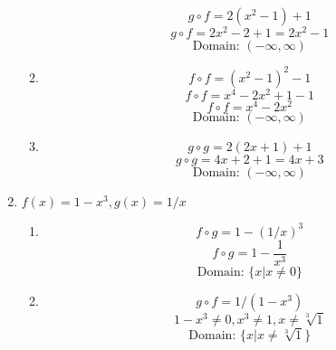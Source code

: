 \documentclass{article}
\begin{document}
\begin{enumerate}
\begin{enumerate}
			$$g \circ f = 2(x^2 - 1) + 1$$
			$$g \circ f = 2x^2 - 2 + 1 = 2x^2 - 1$$
			$$\text{Domain: } (-\infty, \infty)$$
			
			\item
			
			$$f \circ f = (x^2 - 1)^2 - 1$$
			$$f \circ f = x^4 - 2x^2 + 1 - 1$$
			$$f \circ f = x^4 - 2x^2$$
			$$\text{Domain: } (-\infty, \infty)$$
			
			\item
			
			$$g \circ g = 2(2x + 1) + 1$$
			$$g \circ g = 4x + 2 + 1 = 4x + 3$$
			$$\text{Domain: } (-\infty, \infty)$$
		\end{enumerate}
		
		\item $f(x) = 1 - x^3, g(x) = 1/x$
		
		\begin{enumerate}
		
			\item
			$$f \circ g = 1 - (1/x)^3$$
			$$f \circ g = 1 - \frac{1}{x^3}$$
			$$\text{Domain: } \{x | x \neq 0\}$$
			
			\item
			$$g \circ f = 1 / (1 - x^3)$$
			$$ 1 - x^3 \neq 0, x^3 \neq 1, x \neq \sqrt[3]{1}$$
			$$\text{Domain: } \{x | x \neq \sqrt[3]{1}\}$$
		\end{enumerate}

	\end{enumerate}
\end{document}
